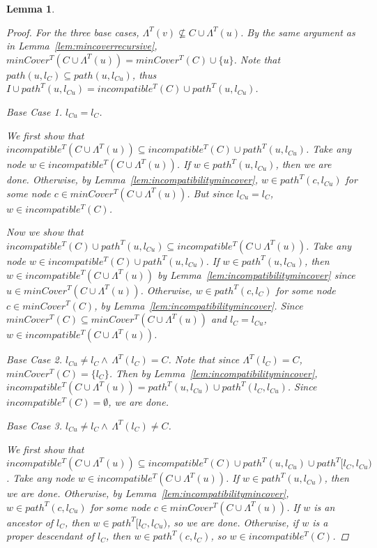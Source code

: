 \documentclass{article}
\newcommand{\leafset}{\Lambda}
\newtheorem{incompatibilityrecursive}[incompatibility]{Lemma}
\begin{document}
\begin{incompatibilityrecursive}
\begin{proof}
            For the three base cases, $\leafset^{T}(v) \not\subseteq C \cup \leafset^{T}(u)$. By the same argument as in Lemma~\ref{lem:mincoverrecursive}, $minCover^{T}(C \cup \leafset^{T}(u)) = minCover^{T}(C) \cup \{u\}$. Note that $path(u, l_C) \subseteq path(u, l_{Cu})$, thus $I \cup path^{T}(u, l_{Cu}) = incompatible^{T}(C) \cup path^{T}(u, l_{Cu})$.

            \textit{Base Case 1.} $l_{Cu} = l_C$.

            We first show that $incompatible^{T}(C \cup \leafset^{T}(u)) \subseteq incompatible^{T}(C) \cup path^{T}(u, l_{Cu})$. Take any node $w \in incompatible^{T}(C \cup \leafset^{T}(u))$. If $w \in path^T(u, l_{Cu})$, then we are done. Otherwise, by Lemma~\ref{lem:incompatibilitymincover}, $w \in path^{T}(c, l_{Cu})$ for some node $c \in minCover^{T}(C \cup \leafset^{T}(u))$. But since $l_{Cu} = l_{C}$, $w \in incompatible^{T}(C)$.

            Now we show that $incompatible^{T}(C) \cup path^{T}(u, l_{Cu}) \subseteq incompatible^{T}(C \cup \leafset^{T}(u))$. Take any node $w \in incompatible^{T}(C) \cup path^{T}(u, l_{Cu})$. If $w \in path^{T}(u, l_{Cu})$, then $w \in incompatible^{T}(C \cup \leafset^{T}(u))$ by Lemma~\ref{lem:incompatibilitymincover} since $u \in minCover^{T}(C \cup \leafset^{T}(u))$. Otherwise, $w \in path^{T}(c, l_C)$ for some node $c \in minCover^{T}(C)$, by Lemma~\ref{lem:incompatibilitymincover}. Since $minCover^{T}(C) \subseteq minCover^{T}(C \cup \leafset^{T}(u))$ and $l_C = l_{Cu}$, $w \in incompatible^{T}(C \cup \leafset^{T}(u))$.

            \textit{Base Case 2.} $l_{Cu} \neq l_C \wedge\, \leafset^{T}(l_C) = C$. Note that since $\leafset^{T}(l_C) = C$, $minCover^{T}(C) = \{l_C\}$. Then by Lemma~\ref{lem:incompatibilitymincover}, $incompatible^{T}(C \cup \leafset^{T}(u)) = path^T(u, l_{Cu}) \cup path^{T}(l_C, l_{Cu})$. Since $incompatible^T(C) = \emptyset$, we are done.

            \textit{Base Case 3.} $l_{Cu} \neq l_C \wedge\, \leafset^{T}(l_C) \neq C$.

            We first show that $incompatible^{T}(C \cup \leafset^{T}(u)) \subseteq incompatible^{T}(C) \cup path^{T}(u, l_{Cu}) \cup path^{T}[l_C, l_{Cu})$. Take any node $w \in incompatible^{T}(C \cup \leafset^{T}(u))$. If $w \in path^T(u, l_{Cu})$, then we are done. Otherwise, by Lemma~\ref{lem:incompatibilitymincover}, $w \in path^{T}(c, l_{Cu})$ for some node $c \in minCover^{T}(C \cup \leafset^{T}(u))$. If $w$ is an ancestor of $l_C$, then $w \in path^{T}[l_C, l_{Cu})$, so we are done. Otherwise, if $w$ is a proper descendant of $l_C$, then $w \in path^{T}(c, l_C)$, so $w \in incompatible^{T}(C)$.


\end{proof}
\end{incompatibilityrecursive}
\end{document}
